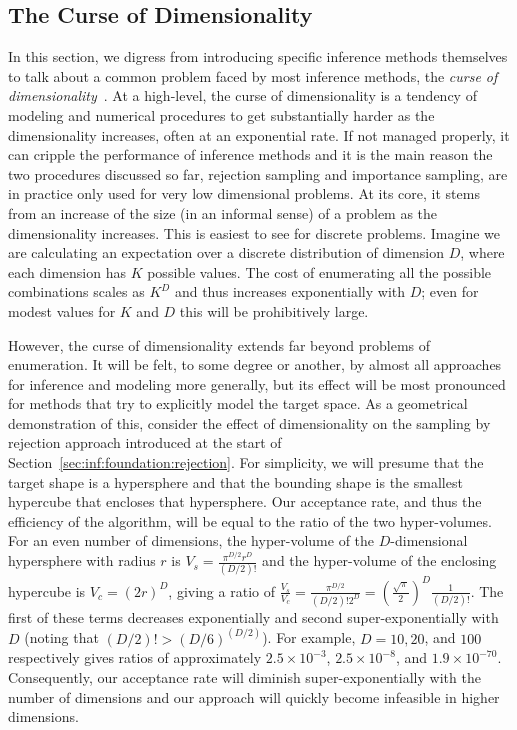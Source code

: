 
\subsection{The Curse of Dimensionality}
\label{sec:inf:foundation:curse}

In this section, we digress from introducing specific inference methods themselves
to talk about a common problem faced by most inference methods, the
\emph{curse of dimensionality}~\citep{bellman1961adaptive}.  At a high-level, the curse of 
dimensionality is a tendency
of modeling and numerical procedures to get substantially harder as the dimensionality increases, 
often at an exponential rate.  If not managed properly, it can cripple the performance of
inference methods and it is the main reason the two procedures discussed so far, rejection
sampling and importance sampling, are in practice only used for very low dimensional problems.
At its core, it stems from an increase of the size (in an informal sense) of a problem as the
dimensionality increases.  This is easiest to see for discrete problems.   Imagine we are calculating
an expectation over a discrete distribution of dimension $D$, where each dimension has $K$
possible values.  The cost of enumerating all the possible combinations scales as $K^D$ and thus
increases exponentially with $D$; even for modest values for $K$ and $D$ this will 
be prohibitively large.

However, the curse of dimensionality extends far beyond problems of enumeration.  It will be felt, to
some degree or another, by almost all approaches for inference and modeling more generally,
but its effect will be most pronounced for methods that try to explicitly model the target
space.  As a geometrical demonstration of this, consider the effect of dimensionality on 
the sampling by rejection approach introduced at the start of Section~\ref{sec:inf:foundation:rejection}.
For simplicity, we will presume that the target shape is a hypersphere and that
the bounding shape is the smallest hypercube that encloses that hypersphere.  Our acceptance rate,
and thus the efficiency of the algorithm, will be equal to the ratio of the two hyper-volumes.  
For an even number of dimensions,
the hyper-volume of the $D$-dimensional hypersphere with radius $r$ is $V_{s} = \frac{\pi^{D/2}r^D}{(D/2)!}$
and the hyper-volume of the enclosing hypercube is $V_c = (2r)^D$, giving a ratio of
$\frac{V_s}{V_c} = \frac{\pi^{D/2}}{(D/2)! 2^D} = \left(\frac{\sqrt{\pi}}{2}\right)^D\frac{1}{(D/2)!}$.
The first of these terms decreases exponentially and second
super-exponentially with $D$ (noting that $(D/2)!>(D/6)^{(D/2)}$).  
For example, $D=10, 20$, and $100$ respectively gives ratios of approximately
$2.5 \times 10^{-3}$, $2.5 \times 10^{-8}$, and $1.9\times 10^{-70}$.  
Consequently, our acceptance rate will diminish
super-exponentially with the number of dimensions and our approach will quickly become
infeasible in higher dimensions.

